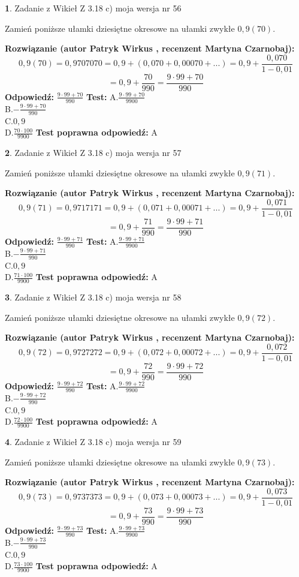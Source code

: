 \documentclass[12pt, a4paper]{article}
\theoremstyle{definition} %
\newtheorem{zad}{}
\newcommand{\zadStart}[1]{\begin{zad}#1\newline}
\newcommand{\zadStop}{\end{zad}}
\newcommand{\rozwStart}[2]{\noindent \textbf{Rozwiązanie (autor #1 , recenzent #2): }\newline}
\newcommand{\rozwStop}{\newline}
\newcommand{\odpStart}{\noindent \textbf{Odpowiedź:}\newline}
\newcommand{\odpStop}{\newline}
\newcommand{\testStart}{\noindent \textbf{Test:}\newline}
\newcommand{\testStop}{\newline}
\newcommand{\kluczStart}{\noindent \textbf{Test poprawna odpowiedź:}\newline}
\newcommand{\kluczStop}{\newline}
\begin{document}
\zadStart{Zadanie z Wikieł Z 3.18 c) moja wersja nr 56}

Zamień poniższe ułamki dziesiętne okresowe na ułamki zwykłe $0,9(70)$.
\zadStop
\rozwStart{Patryk Wirkus}{Martyna Czarnobaj}
$$0,9(70)=0,9707070=0,9+(0,070+0,00070+...)=0,9+\frac{0,070}{1-0,01}$$
$$=0,9+\frac{70}{990}=\frac{9\cdot99+70}{990}$$
\rozwStop
\odpStart
$\frac{9\cdot99+70}{990}$
\odpStop
\testStart
A.$\frac{9\cdot99+70}{9900}$\\ B.$-\frac{9\cdot99+70}{990}$\\ C.$0,9$\\ D.$\frac{70\cdot100}{9900}$
\testStop
\kluczStart
A
\kluczStop



\zadStart{Zadanie z Wikieł Z 3.18 c) moja wersja nr 57}

Zamień poniższe ułamki dziesiętne okresowe na ułamki zwykłe $0,9(71)$.
\zadStop
\rozwStart{Patryk Wirkus}{Martyna Czarnobaj}
$$0,9(71)=0,9717171=0,9+(0,071+0,00071+...)=0,9+\frac{0,071}{1-0,01}$$
$$=0,9+\frac{71}{990}=\frac{9\cdot99+71}{990}$$
\rozwStop
\odpStart
$\frac{9\cdot99+71}{990}$
\odpStop
\testStart
A.$\frac{9\cdot99+71}{9900}$\\ B.$-\frac{9\cdot99+71}{990}$\\ C.$0,9$\\ D.$\frac{71\cdot100}{9900}$
\testStop
\kluczStart
A
\kluczStop



\zadStart{Zadanie z Wikieł Z 3.18 c) moja wersja nr 58}

Zamień poniższe ułamki dziesiętne okresowe na ułamki zwykłe $0,9(72)$.
\zadStop
\rozwStart{Patryk Wirkus}{Martyna Czarnobaj}
$$0,9(72)=0,9727272=0,9+(0,072+0,00072+...)=0,9+\frac{0,072}{1-0,01}$$
$$=0,9+\frac{72}{990}=\frac{9\cdot99+72}{990}$$
\rozwStop
\odpStart
$\frac{9\cdot99+72}{990}$
\odpStop
\testStart
A.$\frac{9\cdot99+72}{9900}$\\ B.$-\frac{9\cdot99+72}{990}$\\ C.$0,9$\\ D.$\frac{72\cdot100}{9900}$
\testStop
\kluczStart
A
\kluczStop



\zadStart{Zadanie z Wikieł Z 3.18 c) moja wersja nr 59}

Zamień poniższe ułamki dziesiętne okresowe na ułamki zwykłe $0,9(73)$.
\zadStop
\rozwStart{Patryk Wirkus}{Martyna Czarnobaj}
$$0,9(73)=0,9737373=0,9+(0,073+0,00073+...)=0,9+\frac{0,073}{1-0,01}$$
$$=0,9+\frac{73}{990}=\frac{9\cdot99+73}{990}$$
\rozwStop
\odpStart
$\frac{9\cdot99+73}{990}$
\odpStop
\testStart
A.$\frac{9\cdot99+73}{9900}$\\ B.$-\frac{9\cdot99+73}{990}$\\ C.$0,9$\\ D.$\frac{73\cdot100}{9900}$
\testStop
\kluczStart
A
\kluczStop
\end{document}
